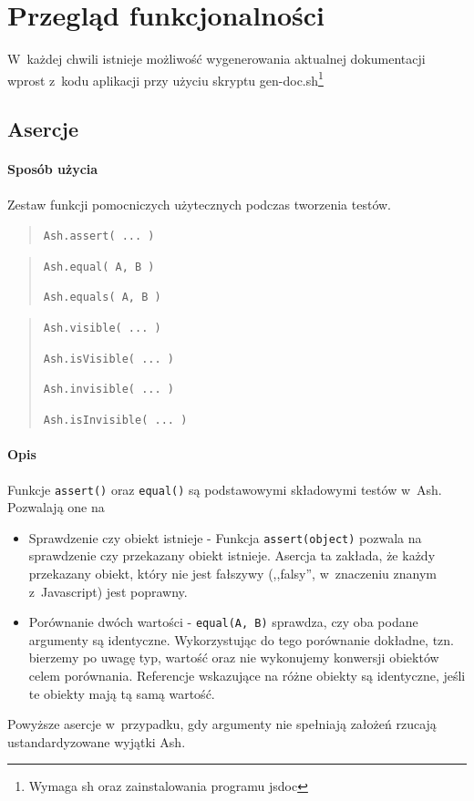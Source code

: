 \documentclass[brudnopis]{xmgr}
\begin{document}
\chapter{Przegląd funkcjonalności}

W~każdej chwili istnieje możliwość wygenerowania aktualnej dokumentacji wprost z~kodu aplikacji przy użyciu skryptu gen-doc.sh\footnote{Wymaga sh oraz zainstalowania programu jsdoc}

\section{Asercje}

\subsubsection{Sposób użycia}

Zestaw funkcji pomocniczych użytecznych podczas tworzenia testów.

\begin{quote}
  \texttt{Ash.assert( ... )} 
\end{quote}

\begin{quote}
  \texttt{Ash.equal( A, B )}

  \texttt{Ash.equals( A, B )} 
\end{quote}

\begin{quote}
  \texttt{Ash.visible( ... )} 

  \texttt{Ash.isVisible( ... )}

  \texttt{Ash.invisible( ... )}

  \texttt{Ash.isInvisible( ... )}
\end{quote}

\subsubsection{Opis}

Funkcje \texttt{assert()} oraz \texttt{equal()} są podstawowymi składowymi testów w~Ash. Pozwalają one na 

\begin{itemize}
  \item Sprawdzenie czy obiekt istnieje - Funkcja \texttt{assert(object)} pozwala na sprawdzenie czy przekazany obiekt istnieje. Asercja ta zakłada, że każdy przekazany obiekt, który nie jest fałszywy (,,falsy'', w~znaczeniu znanym z~Javascript) jest poprawny. 
  \item Porównanie dwóch wartości - \texttt{equal(A, B)} sprawdza, czy oba podane argumenty są identyczne. Wykorzystując do tego porównanie dokładne, tzn. bierzemy po uwagę typ, wartość oraz nie wykonujemy konwersji obiektów celem porównania. Referencje wskazujące na różne obiekty są identyczne, jeśli te obiekty mają tą samą wartość.
\end{itemize}
Powyższe asercje w~przypadku, gdy argumenty nie spełniają założeń rzucają ustandardyzowane wyjątki Ash. 
\end{document}
